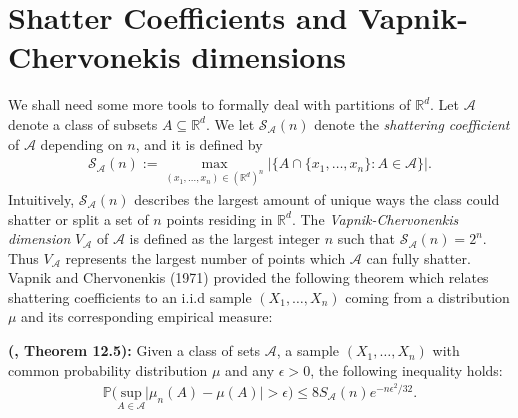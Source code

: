 \documentclass{report}
\begin{document}
\section{Shatter Coefficients and Vapnik-Chervonekis dimensions}
We shall need some more tools to formally deal with partitions of $\mathbb{R}^d$. Let $\mathcal{A}$ denote a class of subsets $A \subseteq \mathbb{R}^d$. We let $\mathcal{S}_\mathcal{A}(n)$
denote the \textit{shattering coefficient} of $\mathcal{A}$ depending on $n$, and it is defined by
\begin{align*}
	\mathcal{S}_\mathcal{A}(n) := \max_{(x_1,\dots,x_n) \in (\mathbb{R}^d)^n} \big|\{A \cap \{x_1,\dots,x_n\} : A \in \mathcal{A}\}\big|.
\end{align*}
Intuitively, $\mathcal{S}_\mathcal{A}(n)$ describes the largest amount of unique ways the class could shatter or split a set of $n$ points residing in $\mathbb{R}^d$. 
The \textit{Vapnik-Chervonenkis dimension} $V_\mathcal{A}$ of $\mathcal{A}$ is defined as the largest integer $n$ such that $\mathcal{S}_\mathcal{A}(n) = 2^n$. Thus
$V_\mathcal{A}$ represents the largest number of points which $\mathcal{A}$ can fully shatter. Vapnik and Chervonenkis (1971) provided the following theorem which relates
shattering coefficients to an i.i.d sample $(X_1,\dots,X_n)$ coming from a distribution $\mu$ and its corresponding empirical measure:\newline

\noindent\textbf{(\cite{Pattern}, Theorem 12.5): } Given a class of sets $\mathcal{A}$, a sample $(X_1,\dots,X_n)$ with common probability distribution $\mu$ and any $\epsilon > 0$, the
following inequality holds:
\begin{align*}
	\mathbb{P}\bigg( \underset{A \in \mathcal{A}}{\text{sup}} \big|\mu_n(A) - \mu(A)\big| > \epsilon \bigg) \leq 8 S_\mathcal{A}(n) e^{-n\epsilon^2/32}.
\end{align*}
\end{document}
